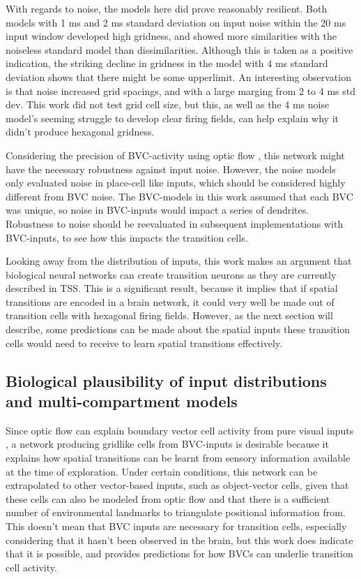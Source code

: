 \documentclass{article}
\begin{document}
    With regards to noise, the models here did prove reasonably resilient. Both models with 1 ms and 2 ms standard deviation on input noise within the 20 ms input window developed high gridness, and showed more similarities with the noiseless standard model than dissimilarities. Although this is taken as a positive indication, the striking decline in gridness in the model with 4 ms standard deviation shows that there might be some upperlimit. An interesting observation is that noise increased grid spacings, and with a large marging from 2 to 4 ms std dev. This work did not test grid cell size, but this, as well as the 4 ms noise model's seeming struggle to develop clear firing fields, can help explain why it didn't produce hexagonal gridness.

    Considering the precision of BVC-activity using optic flow \parencite{Raudies2012}, this network might have the necessary robustness against input noise. However, the noise models only evaluated noise in place-cell like inputs, which should be considered highly different from BVC noise. The BVC-models in this work assumed that each BVC was unique, so noise in BVC-inputs would impact a series of dendrites. Robustness to noise should be reevaluated in subsequent implementations with BVC-inputs, to see how this impacts the transition cells.

    Looking away from the distribution of inputs, this work makes an argument that biological neural networks can create transition neurons as they are currently described in TSS. This is a significant result, because it implies that if spatial transitions are encoded in a brain network, it could very well be made out of transition cells with hexagonal firing fields. However, as the next section will describe, some predictions can be made about the spatial inputs these transition cells would need to receive to learn spatial transitions effectively.   

    \subsection{Biological plausibility of input distributions and multi-compartment models} \label{Future: BVCs}

    Since optic flow can explain boundary vector cell activity from pure visual inputs \parencite{Raudies2012}, a network producing gridlike cells from BVC-inputs is desirable because it explains how spatial transitions can be learnt from sensory information available at the time of exploration. Under certain conditions, this network can be extrapolated to other vector-based inputs, such as object-vector cells, given that these cells can also be modeled from optic flow and that there is a sufficient number of environmental landmarks to triangulate positional information from. This doesn't mean that BVC inputs are necessary for transition cells, especially considering that it hasn't been observed in the brain, but this work does indicate that it is possible, and provides predictions for how BVCs can underlie transition cell activity.
\end{document}
